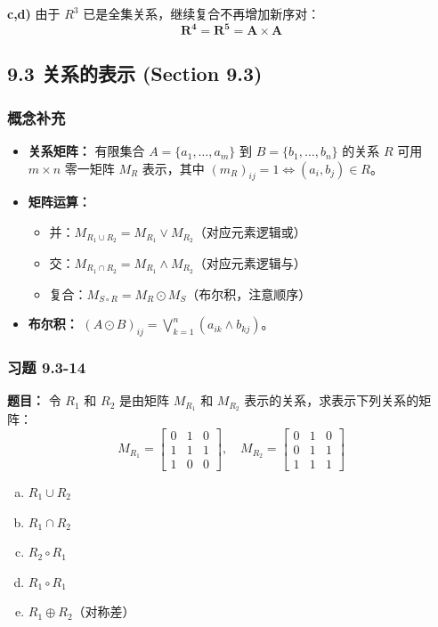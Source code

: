 \documentclass[11pt,UTF8]{article}
\begin{document}
\textbf{c,d)} 由于 $R^3$ 已是全集关系，继续复合不再增加新序对：
\[ \mathbf{R^4 = R^5 = A \times A} \]



\subsection{9.3 关系的表示 (Section 9.3)}

\subsubsection*{概念补充}
\begin{itemize}
    \item \textbf{关系矩阵：} 有限集合 $A=\{a_1,\dots,a_m\}$ 到 $B=\{b_1,\dots,b_n\}$ 的关系 $R$ 可用 $m \times n$ 零一矩阵 $M_R$ 表示，其中 $(m_R)_{ij}=1 \iff (a_i,b_j) \in R$。
    \item \textbf{矩阵运算：}
    \begin{itemize}
        \item 并：$M_{R_1 \cup R_2} = M_{R_1} \lor M_{R_2}$（对应元素逻辑或）
        \item 交：$M_{R_1 \cap R_2} = M_{R_1} \land M_{R_2}$（对应元素逻辑与）
        \item 复合：$M_{S \circ R} = M_R \odot M_S$（布尔积，注意顺序）
    \end{itemize}
    \item \textbf{布尔积：} $(A \odot B)_{ij} = \bigvee_{k=1}^{n} (a_{ik} \land b_{kj})$。
\end{itemize}

\subsubsection*{习题 9.3-14}
\textbf{题目：} 令 $R_1$ 和 $R_2$ 是由矩阵 $M_{R_1}$ 和 $M_{R_2}$ 表示的关系，求表示下列关系的矩阵：
\[ M_{R_1} = \begin{bmatrix} 0 & 1 & 0 \\ 1 & 1 & 1 \\ 1 & 0 & 0 \end{bmatrix}, \quad
M_{R_2} = \begin{bmatrix} 0 & 1 & 0 \\ 0 & 1 & 1 \\ 1 & 1 & 1 \end{bmatrix} \]
\begin{enumerate}[a)]
    \item $R_1 \cup R_2$
    \item $R_1 \cap R_2$
    \item $R_2 \circ R_1$
    \item $R_1 \circ R_1$
    \item $R_1 \oplus R_2$（对称差）
\end{enumerate}
\end{document}
